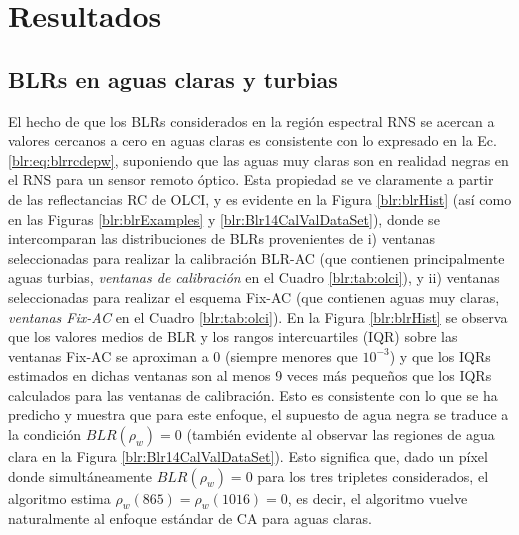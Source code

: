 \section{Resultados}
\label{blr:s:results}

    \subsection{BLRs en aguas claras y turbias}
    \label{blr:s:results:blrs}

        El hecho de que los BLRs considerados en la región espectral RNS se acercan a valores cercanos a cero en aguas claras es consistente con lo expresado en la Ec. \ref{blr:eq:blrrcdepw}, suponiendo que las aguas muy claras son en realidad negras en el RNS para un sensor remoto óptico. Esta propiedad se ve claramente a partir de las reflectancias RC de OLCI, y es evidente en la Figura \ref{blr:blrHist} (así como en las Figuras \ref{blr:blrExamples} y \ref{blr:Blr14CalValDataSet}), donde se intercomparan las distribuciones de BLRs provenientes de i) ventanas seleccionadas para realizar la calibración BLR-AC (que contienen principalmente aguas turbias, \textit{ventanas de calibración} en el Cuadro \ref{blr:tab:olci}), y ii) ventanas seleccionadas para realizar el esquema Fix-AC (que contienen aguas muy claras, \textit{ventanas Fix-AC} en el Cuadro \ref{blr:tab:olci}). En la Figura \ref{blr:blrHist} se observa que los valores medios de BLR y los rangos intercuartiles (IQR) sobre las ventanas Fix-AC se aproximan a 0 (siempre menores que $10^{-3}$) y que los IQRs estimados en dichas ventanas son al menos 9 veces más pequeños que los IQRs calculados para las ventanas de calibración.
        Esto es consistente con lo que se ha predicho y muestra que para este enfoque, el supuesto de agua negra se traduce a la condición $BLR(\rho_{w})=0$ (también evidente al observar las regiones de agua clara en la Figura \ref{blr:Blr14CalValDataSet}). Esto significa que, dado un píxel donde simultáneamente $BLR(\rho_{w})=0$ para los tres tripletes considerados, el algoritmo estima $\rho_{w}(865)=\rho_{w}(1016)=0 $, es decir, el algoritmo vuelve naturalmente al enfoque estándar de CA para aguas claras.
        
